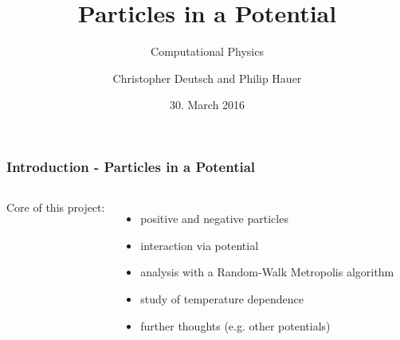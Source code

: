 \documentclass[mathserif,serif]{beamer}
\author{Christopher Deutsch and Philip Hauer}
\title{Particles in a Potential}
\date{30. March 2016}
\subtitle{{\small Computational Physics}}
\begin{document}
\frame[plain]{\titlepage}
\setcounter{framenumber}{0}
\begin{frame}
	\frametitle{Introduction - Particles in a Potential}
		\begin{columns}
			\centering
			Core of this project:
			\begin{itemize}
				\item positive and negative particles
				\item interaction via potential
				\item analysis with a Random-Walk Metropolis algorithm
				\item study of temperature dependence
				\item further thoughts (e.g. other potentials)
			\end{itemize}
			
	\end{columns}
\end{frame}





\end{document}
